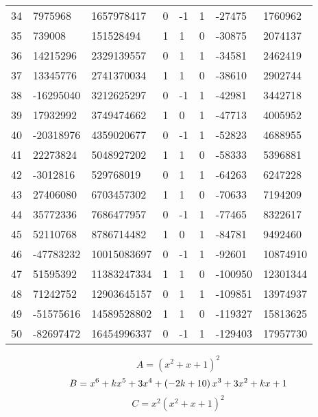 \documentclass{amsart}
\begin{document}
\begin{longtable}{|l|l|l|lllll|}
34&7975968&1657978417&0&-1&1&-27475&1760962\\
35&739008&151528494&1&1&0&-30875&2074137\\
36&14215296&2329139557&0&1&1&-34581&2462419\\
37&13345776&2741370034&1&1&0&-38610&2902744\\
38&-16295040&3212625297&0&-1&1&-42981&3442718\\
39&17932992&3749474662&1&0&1&-47713&4005952\\
40&-20318976&4359020677&0&-1&1&-52823&4688955\\
41&22273824&5048927202&1&1&0&-58333&5396881\\
42&-3012816&529768019&0&1&1&-64263&6247228\\
43&27406080&6703457302&1&1&0&-70633&7194209\\
44&35772336&7686477957&0&-1&1&-77465&8322617\\
45&52110768&8786714482&1&0&1&-84781&9492460\\
46&-47783232&10015083697&0&-1&1&-92601&10874910\\
47&51595392&11383247334&1&1&0&-100950&12301344\\
48&71242752&12903645157&0&1&1&-109851&13974937\\
49&-51575616&14589528802&1&1&0&-119327&15813625\\
50&-82697472&16454996337&0&-1&1&-129403&17957730\\
\hline
\end{longtable}
$$A=(x^2
 + x
 + 1)^{2}$$
$$B=x^6
 + k\*x^5
 + 3\*x^4
 + \left(-2\*k
 + 10\right) \*x^3
 + 3\*x^2
 + k\*x
 + 1$$
$$C=x^2(x^2
 + x
 + 1)^{2}$$
\end{document}
